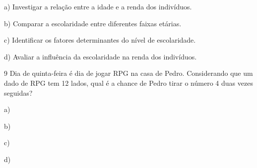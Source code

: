 a) Investigar a relação entre a idade e a renda dos indivíduos.

b) Comparar a escolaridade entre diferentes faixas etárias.

c) Identificar os fatores determinantes do nível de escolaridade.

d) Avaliar a influência da escolaridade na renda dos indivíduos.



\num{9} Dia de quinta-feira é dia de jogar RPG na casa de Pedro. Considerando
que um dado de RPG tem 12 lados, qual é a chance de Pedro tirar o número
4 duas vezes seguidas?

a)

b)

c)

d)


